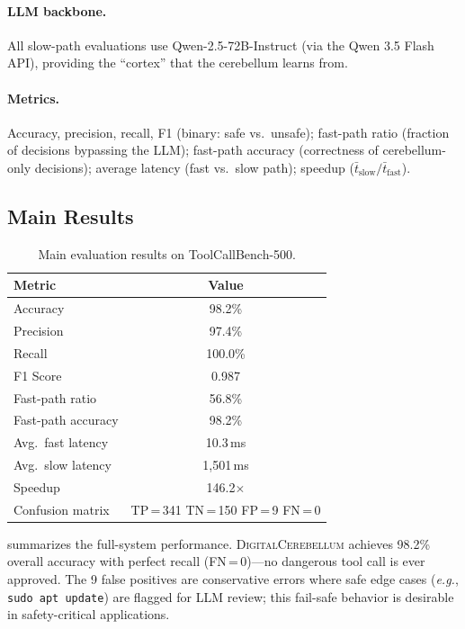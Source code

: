 \documentclass[11pt,a4paper]{article}
\newcommand{\eg}{\textit{e.g.}}
\newcommand{\cb}{\textsc{DigitalCerebellum}}
\begin{document}
\paragraph{LLM backbone.}
All slow-path evaluations use Qwen-2.5-72B-Instruct (via the Qwen 3.5 Flash API), providing the ``cortex'' that the cerebellum learns from.

\paragraph{Metrics.}
Accuracy, precision, recall, F1 (binary: safe vs.\ unsafe);
fast-path ratio (fraction of decisions bypassing the LLM);
fast-path accuracy (correctness of cerebellum-only decisions);
average latency (fast vs.\ slow path);
speedup ($\bar{t}_{\text{slow}} / \bar{t}_{\text{fast}}$).

\subsection{Main Results}\label{sec:main_results}

\begin{table}[t]
\centering
\caption{Main evaluation results on ToolCallBench-500.}
\label{tab:main_results}
\begin{tabular}{lc}
\toprule
Metric & Value \\
\midrule
Accuracy & 98.2\% \\
Precision & 97.4\% \\
Recall & 100.0\% \\
F1 Score & 0.987 \\
\midrule
Fast-path ratio & 56.8\% \\
Fast-path accuracy & 98.2\% \\
Avg.\ fast latency & 10.3\,ms \\
Avg.\ slow latency & 1,501\,ms \\
Speedup & 146.2$\times$ \\
\midrule
Confusion matrix & TP\,=\,341 \;\; TN\,=\,150 \;\; FP\,=\,9 \;\; FN\,=\,0 \\
\bottomrule
\end{tabular}
\end{table}

 summarizes the full-system performance.
\cb{} achieves 98.2\% overall accuracy with perfect recall (FN\,=\,0)---no dangerous tool call is ever approved.
The 9 false positives are conservative errors where safe edge cases (\eg{}, \texttt{sudo apt update}) are flagged for LLM review; this fail-safe behavior is desirable in safety-critical applications.
\end{document}
